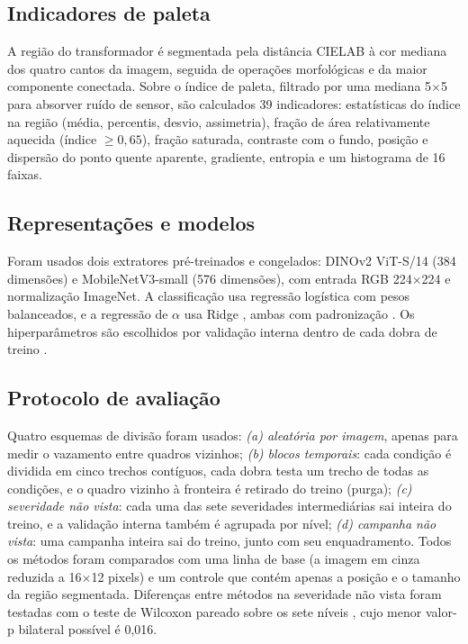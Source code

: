 \documentclass[11pt,a4paper]{article}
\begin{document}
\subsection{Indicadores de paleta}
A região do transformador é segmentada pela distância CIELAB à cor mediana dos quatro cantos da imagem, seguida de operações morfológicas e da maior componente conectada. Sobre o índice de paleta, filtrado por uma mediana 5$\times$5 para absorver ruído de sensor, são calculados 39 indicadores: estatísticas do índice na região (média, percentis, desvio, assimetria), fração de área relativamente aquecida (índice $\geq 0{,}65$), fração saturada, contraste com o fundo, posição e dispersão do ponto quente aparente, gradiente, entropia e um histograma de 16 faixas.

\subsection{Representações e modelos}
Foram usados dois extratores pré-treinados e congelados: DINOv2 ViT-S/14 \cite{oquab2023dinov2} (384 dimensões) e MobileNetV3-small \cite{howard2019mobilenetv3} (576 dimensões), com entrada RGB 224$\times$224 e normalização ImageNet. A classificação usa regressão logística com pesos balanceados, e a regressão de $\alpha$ usa Ridge \cite{hoerl1970ridge}, ambas com padronização \cite{pedregosa2011sklearn}. Os hiperparâmetros são escolhidos por validação interna dentro de cada dobra de treino \cite{varma2006bias,cawley2010}.

\subsection{Protocolo de avaliação}
Quatro esquemas de divisão foram usados:
\textit{(a) aleatória por imagem}, apenas para medir o vazamento entre quadros vizinhos;
\textit{(b) blocos temporais}: cada condição é dividida em cinco trechos contíguos, cada dobra testa um trecho de todas as condições, e o quadro vizinho à fronteira é retirado do treino (purga);
\textit{(c) severidade não vista}: cada uma das sete severidades intermediárias sai inteira do treino, e a validação interna também é agrupada por nível;
\textit{(d) campanha não vista}: uma campanha inteira sai do treino, junto com seu enquadramento.
Todos os métodos foram comparados com uma linha de base (a imagem em cinza reduzida a 16$\times$12 pixels) e um controle que contém apenas a posição e o tamanho da região segmentada. Diferenças entre métodos na severidade não vista foram testadas com o teste de Wilcoxon pareado sobre os sete níveis \cite{wilcoxon1945}, cujo menor valor-p bilateral possível é 0,016.
\end{document}
